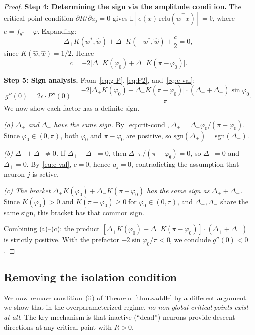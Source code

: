 \documentclass[11pt]{amsart}
\theoremstyle{definition}
\newcommand{\E}{\mathbb{E}}
\newcommand{\relu}{\mathrm{relu}}
\newcommand{\sgn}{\mathrm{sgn}}
\begin{document}
\begin{proof}
\medskip
\noindent\textbf{Step 4: Determining the sign via the amplitude condition.}
The critical-point condition $\partial R / \partial a_j = 0$ gives
$\E[e(x)\,\relu(\hat{w}^\top x)] = 0$, where
$e = f_{\theta^*} - \varphi$.  Expanding:
\[
  \Delta_+ K(w^*, \hat{w}) + \Delta_- K(-w^*, \hat{w}) + \frac{c}{2} = 0,
\]
since $K(\hat{w},\hat{w}) = 1/2$.  Hence
\begin{equation}\label{eq:c-val}
  c = -2\bigl[\Delta_+ K(\varphi_0) + \Delta_- K(\pi - \varphi_0)\bigr].
\end{equation}

\medskip
\noindent\textbf{Step 5: Sign analysis.}
From~\eqref{eq:g-P}, \eqref{eq:P2}, and~\eqref{eq:c-val}:
\[
  g''(0) = 2c \cdot P''(0)
  = \frac{-2\bigl[\Delta_+ K(\varphi_0) + \Delta_- K(\pi-\varphi_0)\bigr]
    \cdot (\Delta_+ + \Delta_-)\sin\varphi_0}{\pi}.
\]
We now show each factor has a definite sign.

\emph{(a) $\Delta_+$ and $\Delta_-$ have the same sign.}
By~\eqref{eq:crit-cond}, $\Delta_+ = \Delta_-\varphi_0/(\pi-\varphi_0)$.
Since $\varphi_0 \in (0,\pi)$, both $\varphi_0$ and $\pi - \varphi_0$ are
positive, so $\sgn(\Delta_+) = \sgn(\Delta_-)$.

\emph{(b) $\Delta_+ + \Delta_- \neq 0$.}
If $\Delta_+ + \Delta_- = 0$, then $\Delta_- \pi/(\pi-\varphi_0) = 0$, so
$\Delta_- = 0$ and $\Delta_+ = 0$.  By~\eqref{eq:c-val}, $c = 0$, hence
$a_j = 0$, contradicting the assumption that neuron $j$ is active.

\emph{(c) The bracket $\Delta_+ K(\varphi_0) + \Delta_- K(\pi-\varphi_0)$
has the same sign as $\Delta_+ + \Delta_-$.}
Since $K(\varphi_0) > 0$ and $K(\pi-\varphi_0) \geq 0$ for
$\varphi_0 \in (0,\pi)$, and $\Delta_+, \Delta_-$ share the same sign,
this bracket has that common sign.

Combining (a)--(c): the product
$[\Delta_+ K(\varphi_0) + \Delta_- K(\pi-\varphi_0)] \cdot (\Delta_+ + \Delta_-)$
is strictly positive.  With the prefactor $-2\sin\varphi_0/\pi < 0$, we
conclude $g''(0) < 0$.
\end{proof}

\subsection{Removing the isolation condition}

We now remove condition~(ii) of Theorem~\ref{thm:saddle} by a different
argument: we show that in the overparameterized regime, \emph{no non-global
critical points exist at all}.  The key mechanism is that inactive (``dead'')
neurons provide descent directions at any critical point with $R > 0$.
\end{document}

